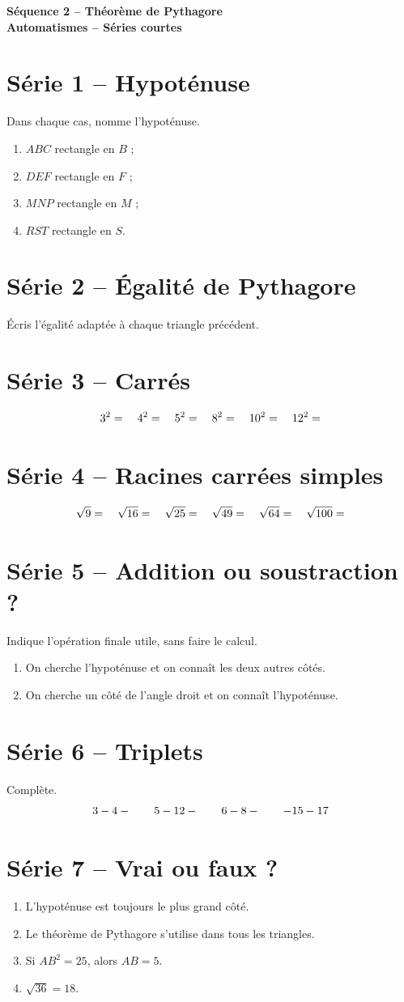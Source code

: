 \documentclass[12pt,a4paper]{article}
\newcommand{\titresequence}[1]{%
\begin{center}
  {\sffamily\LARGE\bfseries\color{TitreC}Séquence 2 -- Théorème de Pythagore}\\[0.2em]
  {\sffamily\large\bfseries\color{SavoirC}#1}
\end{center}}
\begin{document}
\titresequence{Automatismes -- Séries courtes}


\section*{Série 1 -- Hypoténuse}
Dans chaque cas, nomme l'hypoténuse.
\begin{enumerate}[label=\alph*)]
  \item $ABC$ rectangle en $B$ ;
  \item $DEF$ rectangle en $F$ ;
  \item $MNP$ rectangle en $M$ ;
  \item $RST$ rectangle en $S$.
\end{enumerate}

\section*{Série 2 -- Égalité de Pythagore}
Écris l'égalité adaptée à chaque triangle précédent.

\section*{Série 3 -- Carrés}
\[
3^2=\dotfill\quad 4^2=\dotfill\quad 5^2=\dotfill\quad
8^2=\dotfill\quad 10^2=\dotfill\quad 12^2=\dotfill
\]

\section*{Série 4 -- Racines carrées simples}
\[
\sqrt{9}=\dotfill\quad \sqrt{16}=\dotfill\quad \sqrt{25}=\dotfill\quad
\sqrt{49}=\dotfill\quad \sqrt{64}=\dotfill\quad \sqrt{100}=\dotfill
\]

\section*{Série 5 -- Addition ou soustraction ?}
Indique l'opération finale utile, sans faire le calcul.
\begin{enumerate}[label=\alph*)]
  \item On cherche l'hypoténuse et on connaît les deux autres côtés.
  \item On cherche un côté de l'angle droit et on connaît l'hypoténuse.
\end{enumerate}

\section*{Série 6 -- Triplets}
Complète.
\[
3-4-\dotfill
\qquad
5-12-\dotfill
\qquad
6-8-\dotfill
\qquad
\dotfill-15-17
\]

\section*{Série 7 -- Vrai ou faux ?}
\begin{enumerate}
  \item L'hypoténuse est toujours le plus grand côté.
  \item Le théorème de Pythagore s'utilise dans tous les triangles.
  \item Si $AB^2=25$, alors $AB=5$.
  \item $\sqrt{36}=18$.
\end{enumerate}
\end{document}
